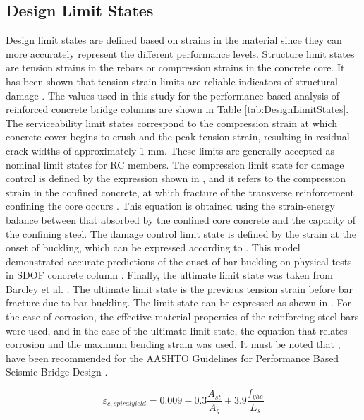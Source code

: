 \subsection{Design Limit States}
Design limit states are defined based on strains in the material since they can more accurately represent the different performance levels. Structure limit states are tension strains in the rebars or compression strains in the concrete core. It has been shown that tension strain limits are reliable indicators of structural damage \cite{Goodnight2016}. The values used in this study for the performance-based analysis of reinforced concrete bridge columns are shown in Table \ref{tab:DesignLimitStates}. The serviceability limit states correspond to the compression strain at which concrete cover begins to crush and the peak tension strain, resulting in residual crack widths of approximately 1 mm. These limits are generally accepted as nominal limit states for RC members. The compression limit state for damage control is defined by the expression shown in , and it refers to the compression strain in the confined concrete, at which fracture of the transverse reinforcement confining the core occurs \cite{Priestley2007}. This equation is obtained using the strain-energy balance between that absorbed by the confined core concrete and the capacity of the confining steel. The damage control limit state is defined by the strain at the onset of buckling, which can be expressed according to . This model demonstrated accurate predictions of the onset of bar buckling on physical tests in SDOF concrete column \cite{Goodnight2016}. Finally, the ultimate limit state was taken from Barcley et al. \cite{Barcley2019}. The ultimate limit state is the previous tension strain before bar fracture due to bar buckling. The limit state can be expressed as shown in . For the case of corrosion, the effective material properties of the reinforcing steel bars were used, and in the case of the ultimate limit state, the equation that relates corrosion and the maximum bending strain was used. It must be noted that ,  have been recommended for the AASHTO Guidelines for Performance Based Seismic Bridge Design \cite{eq:es_DamageControl}.

\begin{equation}
    \varepsilon_{c,spiral yield}=0.009-0.3\frac{A_{st}}{A_{g}} +3.9\frac{f_{yhe}}{E_{s}}
    \label{eq:ec_DamageControl}
\end{equation}

